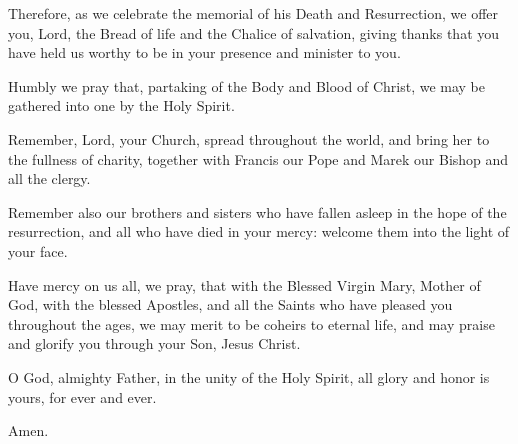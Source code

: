 \pr Therefore, as we celebrate the memorial of his Death and Resurrection, we offer you, Lord, the Bread of life and the Chalice of salvation, giving thanks that you have held us worthy to be in your presence and minister to you.

\pr Humbly we pray that, partaking of the Body and Blood of Christ, we may be gathered into one by the Holy Spirit.

\pr Remember, Lord, your Church, spread throughout the world, and bring her to the fullness of charity, together with Francis our Pope and Marek our Bishop and all the clergy.

\pr Remember also our brothers and sisters who have fallen asleep in the hope of the resurrection, and all who have died in your mercy: welcome them into the light of your face.

\pr Have mercy on us all, we pray, that with the Blessed Virgin Mary, Mother of God, with the blessed Apostles, and all the Saints who have pleased you throughout the ages, we may merit to be coheirs to eternal life, and may praise and glorify you through your Son, Jesus Christ.

\pr O God, almighty Father, in the unity of the Holy Spirit, all glory and honor is yours, for ever and ever.

\be Amen.